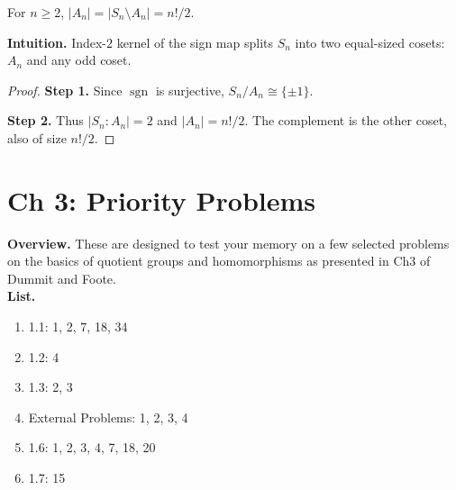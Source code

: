 \documentclass[9pt]{article}
\theoremstyle{definition}
\begin{document}
For $n\ge2$, $|A_n|=|S_n\setminus A_n|=n!/2$.

\dotfill

\noindent\textbf{Intuition.}
Index-$2$ kernel of the sign map splits $S_n$ into two equal-sized cosets: $A_n$ and any odd coset.

\dotfill

\begin{proof}
\textbf{Step 1.} Since $\operatorname{sgn}$ is surjective, $S_n/A_n\cong\{\pm1\}$.

\textbf{Step 2.} Thus $|S_n:A_n|=2$ and $|A_n|=n!/2$. The complement is the other coset, also of size $n!/2$.
\end{proof}


\newpage

\dotfill
\section*{Ch 3: Priority Problems}
\dotfill

\newpage

\noindent \textbf{Overview.} These are designed to test your memory on a few selected problems on the basics of quotient groups and homomorphisms as presented in Ch3 of Dummit and Foote.\\

\noindent \textbf{List.}

\begin{enumerate}
    \item 1.1: 1, 2, 7, 18, 34
    \item 1.2: 4
    \item 1.3: 2, 3
    \item External Problems: 1, 2, 3, 4
    \item 1.6: 1, 2, 3, 4, 7, 18, 20
    \item 1.7: 15
\end{enumerate}

\newpage
\end{document}
